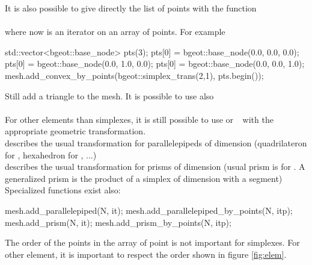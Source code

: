 \documentclass[11pt,a4paper]{article}
\begin{document}
It is also possible to give directly the list of points with the function\\[0.5cm]
\\[0.5cm]
where now  is an iterator on an array of points. For example\\[0.5cm]
\begin{cppcode}
  std::vector<bgeot::base\_node> pts(3);
  pts[0] = bgeot::base\_node(0.0, 0.0, 0.0);
  pts[0] = bgeot::base\_node(0.0, 1.0, 0.0);
  pts[0] = bgeot::base\_node(0.0, 0.0, 1.0);
  mesh.add\_convex\_by\_points(bgeot::simplex\_trans(2,1), pts.begin());
\end{cppcode}
Still add a triangle to the mesh.
It is possible to use also \\[0.5cm]
 \\[0.5cm]

For other elements than simplexes, it is still possible to use  or $\ $$\ $  with the appropriate geometric transformation. \\[0.5cm]
describes the usual transformation for parallelepipeds of dimension  (quadrilateron for , hexahedron for , ...) \\[0.5cm]
describes the usual transformation for prisms of dimension  (usual prism is for . A generalized prism is the product of a simplex of dimension  with a segment) \\[0.5cm]
Specialized functions exist also: \\[0.5cm]
\begin{cppcode}
  mesh.add\_parallelepiped(N, it);
  mesh.add\_parallelepiped\_by\_points(N, itp);
  mesh.add\_prism(N, it);
  mesh.add\_prism\_by\_points(N, itp);
\end{cppcode}

The order of the points in the array of point is not important for simplexes. For other element, it is important to respect the order shown in figure \ref{fig:elem}.
\end{document}
